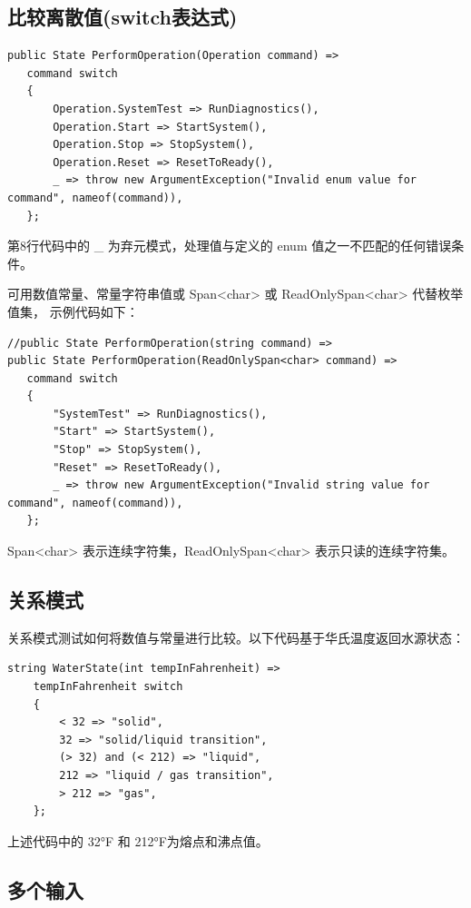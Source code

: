 \subsection{比较离散值(switch表达式)}
\begin{lstlisting}
public State PerformOperation(Operation command) =>
   command switch
   {
       Operation.SystemTest => RunDiagnostics(),
       Operation.Start => StartSystem(),
       Operation.Stop => StopSystem(),
       Operation.Reset => ResetToReady(),
       _ => throw new ArgumentException("Invalid enum value for command", nameof(command)),
   };
\end{lstlisting}

第8行代码中的 \_ 为弃元模式，处理值与定义的 enum 值之一不匹配的任何错误条件。

可用数值常量、常量字符串值或 Span<char> 或 ReadOnlySpan<char> 代替枚举值集，
示例代码如下：
\begin{lstlisting}
//public State PerformOperation(string command) =>
public State PerformOperation(ReadOnlySpan<char> command) =>
   command switch
   {
       "SystemTest" => RunDiagnostics(),
       "Start" => StartSystem(),
       "Stop" => StopSystem(),
       "Reset" => ResetToReady(),
       _ => throw new ArgumentException("Invalid string value for command", nameof(command)),
   };
\end{lstlisting}

Span<char> 表示连续字符集，ReadOnlySpan<char> 表示只读的连续字符集。

\subsection{关系模式}

关系模式测试如何将数值与常量进行比较。以下代码基于华氏温度返回水源状态：

\begin{lstlisting}
string WaterState(int tempInFahrenheit) =>
    tempInFahrenheit switch
    {
        < 32 => "solid",
        32 => "solid/liquid transition",
        (> 32) and (< 212) => "liquid",
        212 => "liquid / gas transition",
        > 212 => "gas",
    };
\end{lstlisting}

上述代码中的 32°F 和 212°F为熔点和沸点值。

\subsection{多个输入}

